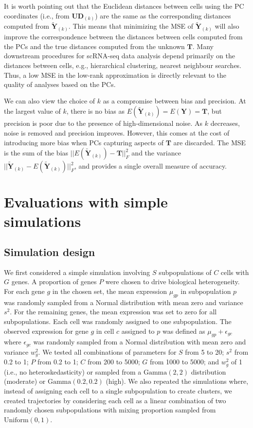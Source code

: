 \documentclass[10pt,letterpaper]{article}
\begin{document}
It is worth pointing out that the Euclidean distances between cells using the PC coordinates (i.e., from $\mathbf{U}\mathbf{D}_{(k)}$) are the same as the corresponding distances computed from $\mathbf{\tilde Y}_{(k)}$.
This means that minimizing the MSE of $\mathbf{\tilde Y}_{(k)}$ will also improve the correspondence between the distances between cells computed from the PCs and the true distances computed from the unknown $\mathbf{T}$.
Many downstream procedures for scRNA-seq data analysis depend primarily on the distances between cells, e.g., hierarchical clustering, nearest neighbour searches.
Thus, a low MSE in the low-rank approximation is directly relevant to the quality of analyses based on the PCs.

We can also view the choice of $k$ as a compromise between bias and precision.
At the largest value of $k$, there is no bias as $E(\mathbf{\tilde Y}_{(k)}) = E(\mathbf{Y}) = \mathbf{T}$, but precision is poor due to the presence of high-dimensional noise.
As $k$ decreases, noise is removed and precision improves.
However, this comes at the cost of introducing more bias when PCs capturing aspects of $\mathbf{T}$ are discarded.
The MSE is the sum of the bias $||E(\mathbf{\tilde Y}_{(k)}) - \mathbf{T}||^2_F$ and the variance $||\mathbf{\tilde Y}_{(k)} - E(\mathbf{\tilde Y}_{(k)})||^2_F$, and provides a single overall measure of accuracy.

\section{Evaluations with simple simulations}

\subsection{Simulation design}
We first considered a simple simulation involving $S$ subpopulations of $C$ cells with $G$ genes.
A proportion of genes $P$ were chosen to drive biological heterogeneity.
For each gene $g$ in the chosen set, the mean expression $\mu_{gp}$ in subpopulation $p$ was randomly sampled from a Normal distribution with mean zero and variance $s^2$.
For the remaining genes, the mean expression was set to zero for all subpopulations.
Each cell was randomly assigned to one subpopulation.
The observed expression for gene $g$ in cell $c$ assigned to $p$ was defined as $\mu_{gp} + \epsilon_{gc}$ where $\epsilon_{gc}$ was randomly sampled from a Normal distribution with mean zero and variance $w^2_g$.
We tested all combinations of parameters for $S$ from 5 to 20; $s^2$ from 0.2 to 1; $P$ from 0.2 to 1; $C$ from 200 to 5000; $G$ from 1000 to 5000;
and $w^2_g$ of 1 (i.e., no heteroskedasticity) or sampled from a $\mbox{Gamma}(2,2)$ distribution (moderate) or $\mbox{Gamma}(0.2,0.2)$ (high).
We also repeated the simulations where, instead of assigning each cell to a single subpopulation to create clusters,
we created trajectories by considering each cell as a linear combination of two randomly chosen subpopulations with mixing proportion sampled from $\mbox{Uniform}(0, 1)$.
\end{document}
